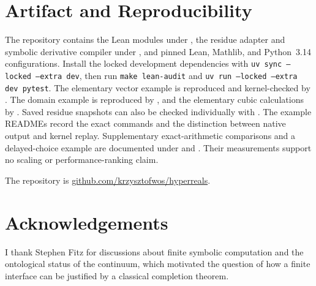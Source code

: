 \documentclass[11pt,a4paper]{article}
\theoremstyle{result}
\theoremstyle{definition}
\newcommand{\code}[1]{\texttt{#1}}
\begin{document}
\section*{Artifact and Reproducibility}

The repository contains the Lean modules under , the residue adapter and symbolic derivative compiler under , and pinned Lean, Mathlib, and Python~3.14 configurations. Install the locked development dependencies with \code{uv sync --locked --extra dev}, then run \code{make lean-audit} and \code{uv run --locked --extra dev pytest}. The elementary vector example is reproduced and kernel-checked by . The domain example is reproduced by , and the elementary cubic calculations by . Saved residue snapshots can also be checked individually with . The example READMEs record the exact commands and the distinction between native output and kernel replay. Supplementary exact-arithmetic comparisons and a delayed-choice example are documented under  and . Their measurements support no scaling or performance-ranking claim.

The repository is \href{https://github.com/krzysztofwos/hyperreals}{github.com/krzysztofwos/hyperreals}.

\section*{Acknowledgements}

I thank Stephen Fitz for discussions about finite symbolic computation and the ontological status of the continuum, which motivated the question of how a finite interface can be justified by a classical completion theorem.



\end{document}
